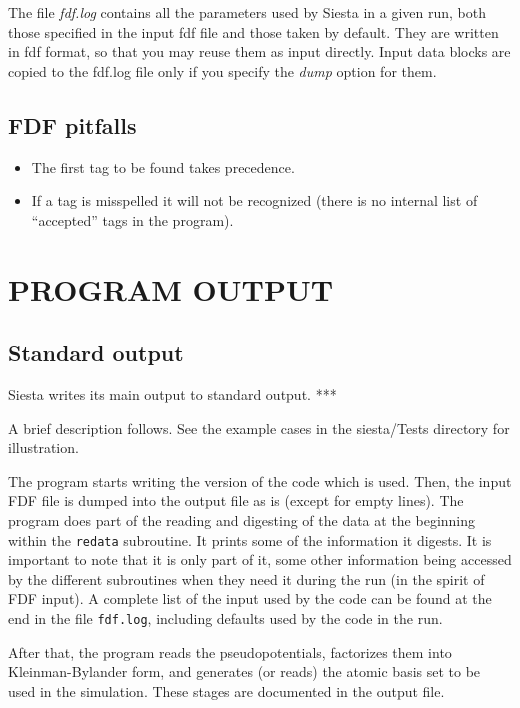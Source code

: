 \documentclass[11pt]{article}
\begin{document}
The file {\it fdf.log} contains all the parameters used by {\sc Siesta}
in a given run, both those specified in the input fdf file and
those taken by default. They are written in fdf format, so that
you may reuse them as input directly. Input data blocks are 
copied to the fdf.log file only if you specify the {\it dump} option
for them.

\subsection{FDF pitfalls}

\begin{itemize}
\item The first tag to be found takes precedence.
\item If a tag is misspelled it will not be recognized (there is no
  internal list of ``accepted'' tags in the program).
\end{itemize}

\section{PROGRAM OUTPUT}

\subsection{Standard output} 

{\sc Siesta} writes its main output to standard output. ***

A brief description follows. See the example cases in the 
siesta/Tests directory for illustration. 

The program starts writing the version of the code which is
used. Then, the input FDF file is dumped into the output file as is
(except for empty lines). The program does part of the reading and
digesting of the data at the beginning within the {\tt redata}
subroutine. It prints some of the information it digests. It is
important to note that it is only part of it, some other information
being accessed by the different subroutines when they need it during
the run (in the spirit of FDF input).  A complete list of the input
used by the code can be found at the end in the file {\tt fdf.log},
including defaults used by the code in the run.

After that, the program reads the pseudopotentials, factorizes them
into Kleinman-Bylander form, and generates (or reads) the atomic basis
set to be used in the simulation. These stages are documented in the
output file.
\end{document}
